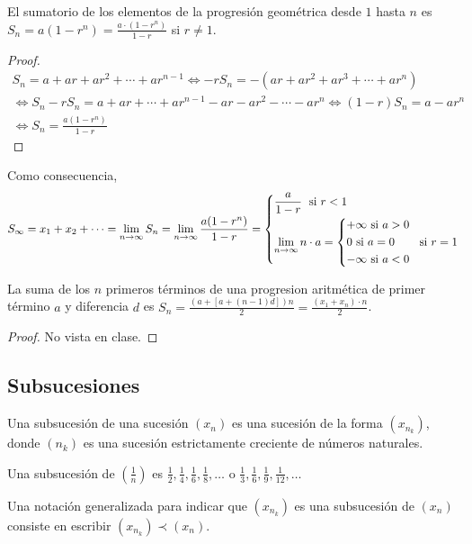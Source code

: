 \begin{proposition}
	El sumatorio de los elementos de la progresión geométrica desde \(1 \) hasta \(n \) es \(S_n = a(1 - r^{n }) = \frac{a \cdot (1-r^{n } )}{1 - r }\) si \(r \neq  1 \).
\end{proposition}
\begin{proof}
	\begin{multline*}
		S_n = a + ar + ar^{2} + \cdots + ar^{n-1} \iff  -rS_n = -(ar + ar^{2} + ar^{3} + \cdots + ar^{n}) \\
		\iff S_n - rS_n = a + ar + \cdots + ar^{n-1} - ar - ar^{2} - \cdots - ar^{n} \iff  (1 - r) S_n = a - ar^{n} \\ \iff S_n = \frac{a(1 - r^{n})}{1 - r}
	\end{multline*}
\end{proof}
Como consecuencia, 
\[
	S_\infty = x_1 + x_2 + \cdots = \lim\limits_{n \to \infty} S_n = \lim\limits_{n \to \infty} \frac{a(1-r^{n} ) }{1 - r} = \begin{dcases}
		\frac{a }{1-r } \; \text{ si } r < 1 \\
		\lim\limits_{n \to \infty} n \cdot a = \begin{dcases}
			                                       +\infty \text{ si } a > 0 \\
			                                       0 \text{ si } a = 0       \\
			                                       -\infty \text{ si } a < 0 \\
		                                       \end{dcases} \; \text{ si } r = 1
	\end{dcases}
\]

\begin{proposition}
	La suma de los \(n \) primeros términos de una progresion aritmética de primer término \(a \) y diferencia \(d \) es \(S_n = \frac{(a + [a + (n-1)d])n}{2} = \frac{(x_1 + x_n)\cdot n}{2}\). 
\end{proposition}
\begin{proof}
	No vista en clase. 
\end{proof}

\subsection{Subsucesiones}
\begin{definition}
	Una subsucesión de una sucesión \((x_n )\) es una sucesión de la forma \((x_{n_k})\), donde \((n_k )\) es una sucesión estrictamente creciente de números naturales.
\end{definition}
\begin{example}
	Una subsucesión de \((\frac{1}{n })\) es \(\frac{1}{2}, \frac{1}{4}, \frac{1}{6}, \frac{1}{8}, \ldots \) o \(\frac{1}{3}, \frac{1}{6}, \frac{1}{9}, \frac{1}{12}, \ldots \)
\end{example}
Una notación generalizada para indicar que \((x_{n_k })\) es una subsucesión de \((x_n )\) consiste en escribir \((x_{n_k}) \prec (x_n)\).

